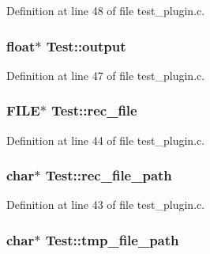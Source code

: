 Definition at line 48 of file test\+\_\+plugin.\+c.

\subsubsection[{\texorpdfstring{output}{output}}]{\setlength{\rightskip}{0pt plus 5cm}float$\ast$ Test\+::output}\hypertarget{struct_test_ae1c066e332063a17a647b1c674f78c4b}{}\label{struct_test_ae1c066e332063a17a647b1c674f78c4b}


Definition at line 47 of file test\+\_\+plugin.\+c.

\subsubsection[{\texorpdfstring{rec\+\_\+file}{rec_file}}]{\setlength{\rightskip}{0pt plus 5cm}F\+I\+LE$\ast$ Test\+::rec\+\_\+file}\hypertarget{struct_test_ad90de8c0e4d29a47e48d9632f4a7fc0a}{}\label{struct_test_ad90de8c0e4d29a47e48d9632f4a7fc0a}


Definition at line 44 of file test\+\_\+plugin.\+c.

\subsubsection[{\texorpdfstring{rec\+\_\+file\+\_\+path}{rec_file_path}}]{\setlength{\rightskip}{0pt plus 5cm}char$\ast$ Test\+::rec\+\_\+file\+\_\+path}\hypertarget{struct_test_a9e3b8c65f5a633a2b8062f1cd9aba8a8}{}\label{struct_test_a9e3b8c65f5a633a2b8062f1cd9aba8a8}


Definition at line 43 of file test\+\_\+plugin.\+c.

\subsubsection[{\texorpdfstring{tmp\+\_\+file\+\_\+path}{tmp_file_path}}]{\setlength{\rightskip}{0pt plus 5cm}char$\ast$ Test\+::tmp\+\_\+file\+\_\+path}\hypertarget{struct_test_a9000ddac38f1cb743bf56dddb346e907}{}\label{struct_test_a9000ddac38f1cb743bf56dddb346e907}


